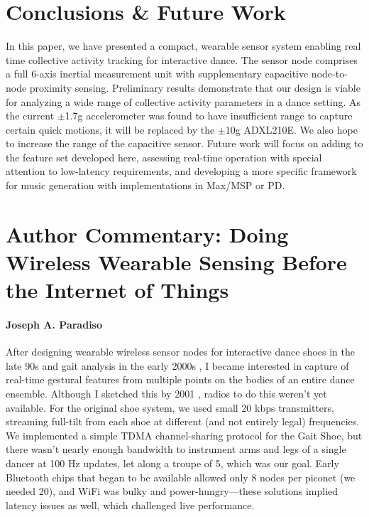 \section{Conclusions \& Future Work}


In this paper, we have presented a compact, wearable sensor system enabling real
time collective activity tracking for interactive dance. The sensor node
comprises a full 6-axis inertial measurement unit with supplementary capacitive
node-to-node proximity sensing. Preliminary results demonstrate that our design
is viable for analyzing a wide range of collective activity parameters in a dance
setting. As the current $\pm{}$1.7g accelerometer was found to have insufficient
range to capture certain quick motions, it will be replaced by the $\pm{}$10g
ADXL210E. We also hope to increase the range of the capacitive sensor. Future
work will focus on adding to the feature set developed here, assessing real-time
operation with special attention to low-latency requirements, and developing a
more specific framework for music generation with implementations in Max/MSP or
PD.

\section*{Author Commentary: Doing Wireless Wearable Sensing Before the Internet of Things}
\paragraph{Joseph A. Paradiso}

After designing wearable wireless sensor nodes for interactive dance shoes in the late 90s \cite{Paradiso:2002} and gait analysis in the early 2000s \cite{Bamberg:2008}, I became interested in capture of real-time gestural features from multiple points on the bodies of an entire dance ensemble.  Although I sketched this by 2001 \cite{Paradiso:2002}, radios to do this weren't yet available.  For the original shoe system, we used small 20 kbps transmitters, streaming full-tilt from each shoe at different (and not entirely legal) frequencies.  We implemented a simple TDMA channel-sharing protocol for the Gait Shoe, but there wasn't nearly enough bandwidth to instrument arms and legs of a single dancer at 100 Hz updates, let along a troupe of 5, which was our goal.  Early Bluetooth chips that began to be available allowed only 8 nodes per piconet (we needed 20), and WiFi was bulky and power-hungry---these solutions implied latency issues as well, which challenged live performance.

